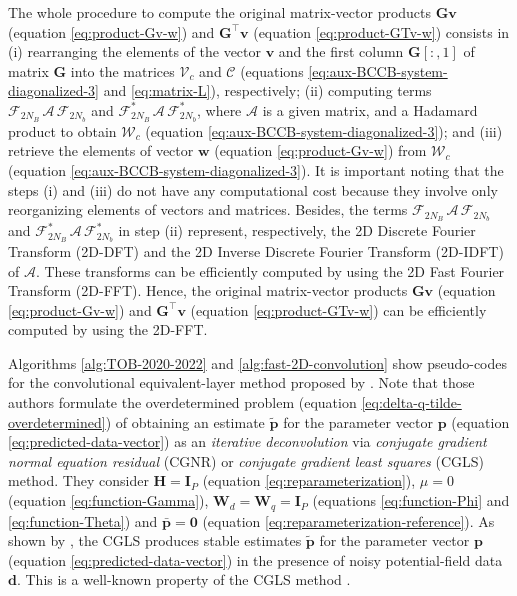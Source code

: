 The whole procedure to compute the original matrix-vector products $\mathbf{G}\mathbf{v}$ (equation \ref{eq:product-Gv-w})
and $\mathbf{G}^{\top}\mathbf{v}$ (equation \ref{eq:product-GTv-w}) consists in 
(i) rearranging the elements of the vector $\mathbf{v}$ and the first column $\mathbf{G}[:,1]$ of matrix $\mathbf{G}$
into the matrices $\boldsymbol{\mathcal{V}}_{c}$ and $\boldsymbol{\mathcal{C}}$ 
(equations \ref{eq:aux-BCCB-system-diagonalized-3} and \ref{eq:matrix-L}), respectively;
(ii) computing terms $\boldsymbol{\mathcal{F}}_{2N_{B}} \, \boldsymbol{\mathcal{A}} \, \boldsymbol{\mathcal{F}}_{2N_{b}}$
and $\boldsymbol{\mathcal{F}}_{2N_{B}}^{\ast} \, \boldsymbol{\mathcal{A}} \, \boldsymbol{\mathcal{F}}_{2N_{b}}^{\ast}$,
where $\boldsymbol{\mathcal{A}}$ is a given matrix, and a Hadamard product to obtain $\boldsymbol{\mathcal{W}}_{c}$ 
(equation \ref{eq:aux-BCCB-system-diagonalized-3}); and
(iii) retrieve the elements of vector $\mathbf{w}$ (equation \ref{eq:product-Gv-w}) from
$\boldsymbol{\mathcal{W}}_{c}$ (equation \ref{eq:aux-BCCB-system-diagonalized-3}).
It is important noting that the steps (i) and (iii) do not have any computational cost because they involve
only reorganizing elements of vectors and matrices.
Besides, the terms $\boldsymbol{\mathcal{F}}_{2N_{B}} \, \boldsymbol{\mathcal{A}} \, \boldsymbol{\mathcal{F}}_{2N_{b}}$
and $\boldsymbol{\mathcal{F}}_{2N_{B}}^{\ast} \, \boldsymbol{\mathcal{A}} \, \boldsymbol{\mathcal{F}}_{2N_{b}}^{\ast}$
in step (ii) represent, respectively, the 2D Discrete Fourier Transform (2D-DFT) and 
the 2D Inverse Discrete Fourier Transform (2D-IDFT) of $\boldsymbol{\mathcal{A}}$.
These transforms can be efficiently computed by using the 2D Fast Fourier Transform (2D-FFT).
Hence, the original matrix-vector products $\mathbf{G}\mathbf{v}$ (equation \ref{eq:product-Gv-w})
and $\mathbf{G}^{\top}\mathbf{v}$ (equation \ref{eq:product-GTv-w}) can be efficiently computed by using the 2D-FFT.

Algorithms \ref{alg:TOB-2020-2022} and \ref{alg:fast-2D-convolution} show pseudo-codes for the convolutional equivalent-layer 
method proposed by \citet{takahashi-etal2020, takahashi-etal2022}.
Note that those authors formulate the overdetermined problem (equation \ref{eq:delta-q-tilde-overdetermined}) of obtaining 
an estimate $\tilde{\mathbf{p}}$ for the parameter vector $\mathbf{p}$ (equation \ref{eq:predicted-data-vector}) as an \textit{iterative deconvolution} via 
\textit{conjugate gradient normal equation residual} (CGNR) \citet[][sec. 11.3]{golub-vanloan2013} or \textit{conjugate gradient least squares} (CGLS) 
\cite[][p. 165]{aster_etal2019} method. 
They consider $\mathbf{H} = \mathbf{I}_{P}$ (equation \ref{eq:reparameterization}), 
$\mu = 0$ (equation \ref{eq:function-Gamma}), 
$\mathbf{W}_{d} = \mathbf{W}_{q} = \mathbf{I}_{P}$ (equations \ref{eq:function-Phi} and \ref{eq:function-Theta})
and $\bar{\mathbf{p}} = \mathbf{0}$ (equation \ref{eq:reparameterization-reference}).
As shown by \citet{takahashi-etal2020, takahashi-etal2022}, the CGLS produces stable estimates $\tilde{\mathbf{p}}$ for the
parameter vector $\mathbf{p}$ (equation \ref{eq:predicted-data-vector}) in the presence of 
noisy potential-field data $\mathbf{d}$. This is a well-known property of the CGLS method \citep[e.g.,][p. 166]{aster_etal2019}.

